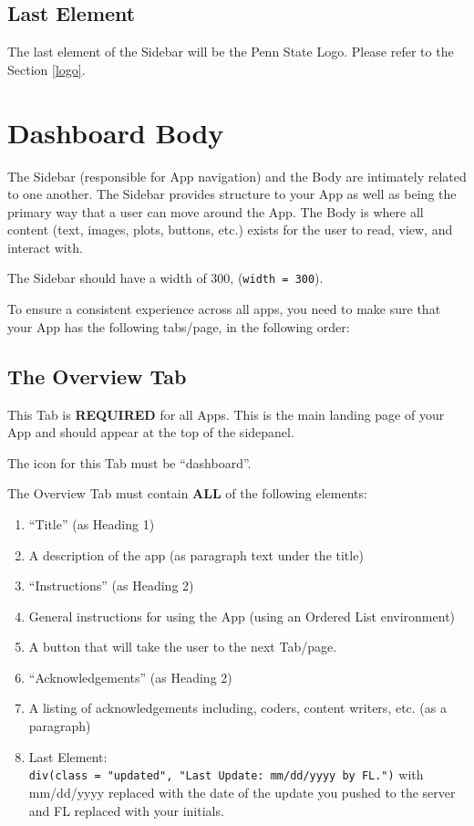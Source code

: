 \documentclass[
]{book}
\providecommand{\tightlist}{%
  \setlength{\itemsep}{0pt}\setlength{\parskip}{0pt}}
\begin{document}
\hypertarget{last-element}{%
\subsection{Last Element}\label{last-element}}

The last element of the Sidebar will be the Penn State Logo. Please refer to the Section \ref{logo}.

\hypertarget{dashboard-body}{%
\section{Dashboard Body}\label{dashboard-body}}

The Sidebar (responsible for App navigation) and the Body are intimately related to one another. The Sidebar provides structure to your App as well as being the primary way that a user can move around the App. The Body is where all content (text, images, plots, buttons, etc.) exists for the user to read, view, and interact with.

The Sidebar should have a width of 300, (\texttt{width\ =\ 300}).

To ensure a consistent experience across all apps, you need to make sure that your App has the following tabs/page, in the following order:

\hypertarget{the-overview-tab}{%
\subsection{The Overview Tab}\label{the-overview-tab}}

This Tab is \textbf{REQUIRED} for all Apps. This is the main landing page of your App and should appear at the top of the sidepanel.

The icon for this Tab must be ``dashboard''.

The Overview Tab must contain \textbf{ALL} of the following elements:

\begin{enumerate}
\def\labelenumi{\arabic{enumi}.}
\tightlist
\item
  ``Title'' (as Heading 1)
\item
  A description of the app (as paragraph text under the title)
\item
  ``Instructions'' (as Heading 2)
\item
  General instructions for using the App (using an Ordered List environment)
\item
  A button that will take the user to the next Tab/page.
\item
  ``Acknowledgements'' (as Heading 2)
\item
  A listing of acknowledgements including, coders, content writers, etc. (as a paragraph)
\item
  Last Element: \texttt{div(class\ =\ "updated",\ "Last\ Update:\ mm/dd/yyyy\ by\ FL.")} with mm/dd/yyyy replaced with the date of the update you pushed to the server and FL replaced with your initials.
\end{enumerate}
\end{document}
